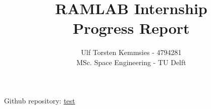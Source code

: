 \documentclass{homework}
\title{RAMLAB Internship \\ Progress Report}
\author{Ulf Torsten Kemmsies - 4794281  \\
MSc. Space Engineering - TU Delft}
\begin{document}
\maketitle

\begin{abstract}

\end{abstract}

\begin{center}
Github repository: \url{test}
\end{center}

\begin{multicols}{2} %












% 










\end{multicols}
\end{document}
